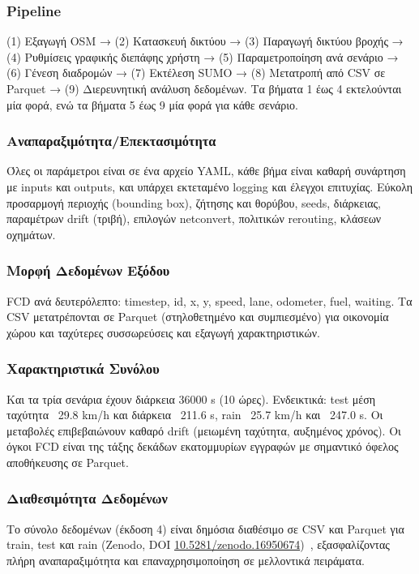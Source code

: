 \subsubsection*{Pipeline}
(1) Εξαγωγή OSM → (2) Κατασκευή δικτύου → (3) Παραγωγή δικτύου βροχής → (4) Ρυθμίσεις γραφικής διεπάφης χρήστη → (5) Παραμετροποίηση ανά σενάριο → (6) Γένεση διαδρομών → (7) Εκτέλεση SUMO → (8) Μετατροπή από CSV σε Parquet → (9) Διερευνητική ανάλυση δεδομένων.
Τα βήματα 1 έως 4 εκτελούνται μία φορά, ενώ τα βήματα 5 έως 9 μία φορά για κάθε σενάριο.

\subsubsection*{Αναπαραξιμότητα/Επεκτασιμότητα}
Όλες οι παράμετροι είναι σε ένα αρχείο YAML, κάθε βήμα είναι καθαρή συνάρτηση με inputs και outputs, και υπάρχει εκτεταμένο logging και έλεγχοι επιτυχίας.
Εύκολη προσαρμογή περιοχής (bounding box), ζήτησης και θορύβου, seeds, διάρκειας, παραμέτρων drift (τριβή), επιλογών netconvert, πολιτικών rerouting, κλάσεων οχημάτων.

\subsubsection*{Μορφή Δεδομένων Εξόδου}
FCD ανά δευτερόλεπτο: timestep, id, x, y, speed, lane, odometer, fuel, waiting.
Τα CSV μετατρέπονται σε Parquet (στηλοθετημένο και συμπιεσμένο) για οικονομία χώρου και ταχύτερες συσσωρεύσεις και εξαγωγή χαρακτηριστικών.

\subsubsection*{Χαρακτηριστικά Συνόλου}
Και τα τρία σενάρια έχουν διάρκεια 36000 s (10 ώρες).
Ενδεικτικά: test μέση ταχύτητα ~29.8 km/h και διάρκεια ~211.6 s, rain ~25.7 km/h και ~247.0 s.
Οι μεταβολές επιβεβαιώνουν καθαρό drift (μειωμένη ταχύτητα, αυξημένος χρόνος).
Οι όγκοι FCD είναι της τάξης δεκάδων εκατομμυρίων εγγραφών με σημαντικό όφελος αποθήκευσης σε Parquet.

\subsubsection*{Διαθεσιμότητα Δεδομένων}
Το σύνολο δεδομένων (έκδοση 4) είναι δημόσια διαθέσιμο σε CSV και Parquet για train, test και rain (Zenodo, DOI \href{https://doi.org/10.5281/zenodo.16950674}{10.5281/zenodo.16950674})~\cite{kyriakopoulos2025synthetic}, εξασφαλίζοντας πλήρη αναπαραξιμότητα και επαναχρησιμοποίηση σε μελλοντικά πειράματα.

